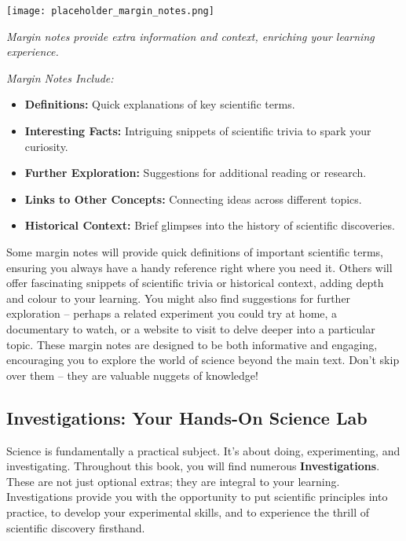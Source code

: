 \begin{marginfigure}[0pt]
\texttt{[image: placeholder\_margin\_notes.png]}
\caption*{}
\textit{Margin notes provide extra information and context, enriching your learning experience.}
\end{marginfigure}

\begin{marginnote}
\textit{Margin Notes Include:}
\begin{itemize}
    \item \textbf{Definitions:} Quick explanations of key scientific terms.
    \item \textbf{Interesting Facts:}  Intriguing snippets of scientific trivia to spark your curiosity.
    \item \textbf{Further Exploration:}  Suggestions for additional reading or research.
    \item \textbf{Links to Other Concepts:}  Connecting ideas across different topics.
    \item \textbf{Historical Context:}  Brief glimpses into the history of scientific discoveries.
\end{itemize}
\end{marginnote}

Some margin notes will provide quick definitions of important scientific terms, ensuring you always have a handy reference right where you need it.  Others will offer fascinating snippets of scientific trivia or historical context, adding depth and colour to your learning.  You might also find suggestions for further exploration – perhaps a related experiment you could try at home, a documentary to watch, or a website to visit to delve deeper into a particular topic.  These margin notes are designed to be both informative and engaging, encouraging you to explore the world of science beyond the main text.  Don’t skip over them – they are valuable nuggets of knowledge!

\FloatBarrier

\subsection{Investigations: Your Hands-On Science Lab}

Science is fundamentally a practical subject.  It's about doing, experimenting, and investigating.  Throughout this book, you will find numerous \textbf{Investigations}. These are not just optional extras; they are integral to your learning.  Investigations provide you with the opportunity to put scientific principles into practice, to develop your experimental skills, and to experience the thrill of scientific discovery firsthand.

